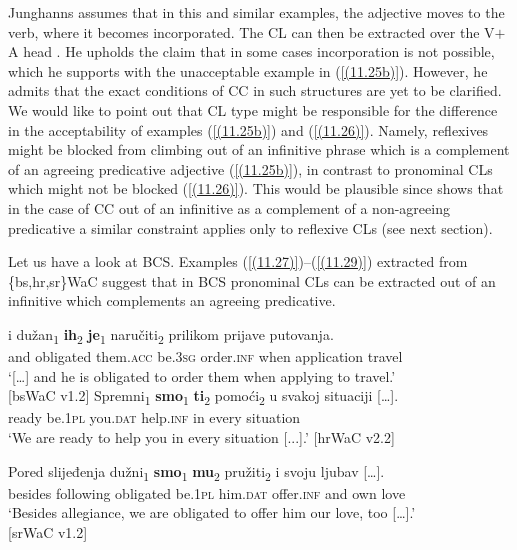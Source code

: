 \noindent Junghanns assumes that in this and similar examples, the adjective moves to the verb, where it becomes incorporated. The CL can then be extracted over the V$+$A head \citep[cf.][76]{Junghanns02}. He upholds the claim that in some cases incorporation is not possible, which he supports with the unacceptable example in (\ref{(11.25b)}). However, he admits that the exact conditions of CC in such structures are yet to be clarified. We would like to point out that CL type might be responsible for the difference in the acceptability of examples (\ref{(11.25b)}) and (\ref{(11.26)}). Namely, reflexives might be blocked from climbing out of an infinitive phrase which is a complement of an agreeing predicative adjective (\ref{(11.25b)}), in contrast to pronominal CLs which might not be blocked (\ref{(11.26)}). This would be plausible since \citet[82]{Dotlacil04} shows that in the case of CC out of an infinitive as a complement of a non-agreeing predicative a similar constraint applies only to reflexive CLs (see next section). 

Let us have a look at BCS. Examples (\ref{(11.27)})--(\ref{(11.29)}) extracted from \{bs,hr,sr\}WaC suggest that in BCS pronominal CLs can be extracted out of an infinitive which complements an agreeing predicative.

\largerpage

\begin{exe}\ex\label{(11.27)}
\gll [\dots] i dužan\textsubscript{1} \textbf{ih}\textsubscript{2} \textbf{je}\textsubscript{1} naručiti\textsubscript{2} prilikom prijave putovanja. \\
 {} and obligated them.\textsc{acc} be.3\textsc{sg} order.\textsc{inf} when application travel \\
\glt ‘[\dots] and he is obligated to order them when applying to travel.’ \\
\hfill [bsWaC v1.2]
\ex\label{(11.28)}
\gll Spremni\textsubscript{1} \textbf{smo}\textsubscript{1} \textbf{ti}\textsubscript{2} pomoći\textsubscript{2} u svakoj {situaciji [\dots].} \\
ready be.1\textsc{pl} you.\textsc{dat} help.\textsc{inf} in every situation \\
\glt ‘We are ready to help you in every situation [...].’
\hfill [hrWaC v2.2]

\ex\label{(11.29)}
\gll Pored slijeđenja dužni\textsubscript{1} \textbf{smo}\textsubscript{1} \textbf{mu}\textsubscript{2} pružiti\textsubscript{2} i svoju {ljubav [\dots].}\\
besides following obligated be.1\textsc{pl} him.\textsc{dat} offer.\textsc{inf} and own love\\
\glt ‘Besides allegiance, we are obligated to offer him our love, too [\dots].’ \\
\hfill [srWaC v1.2]
\end{exe}

